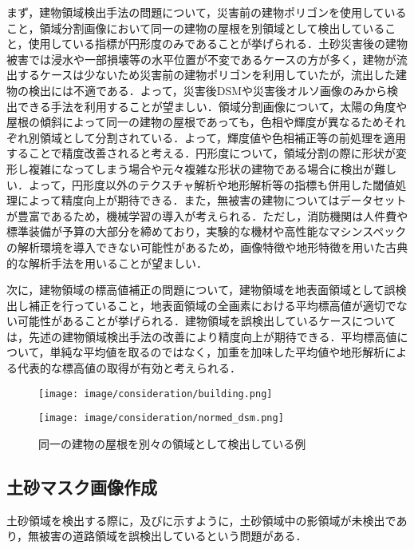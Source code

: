       まず，建物領域検出手法の問題について，災害前の建物ポリゴンを使用していること，領域分割画像において同一の建物の屋根を別領域として検出していること，使用している指標が円形度のみであることが挙げられる．土砂災害後の建物被害では浸水や一部損壊等の水平位置が不変であるケースの方が多く，建物が流出するケースは少ないため災害前の建物ポリゴンを利用していたが，流出した建物の検出には不適である．よって，災害後DSMや災害後オルソ画像のみから検出できる手法を利用することが望ましい．領域分割画像について，太陽の角度や屋根の傾斜によって同一の建物の屋根であっても，色相や輝度が異なるためそれぞれ別領域として分割されている．よって，輝度値や色相補正等の前処理を適用することで精度改善されると考える．円形度について，領域分割の際に形状が変形し複雑になってしまう場合や元々複雑な形状の建物である場合に検出が難しい．よって，円形度以外のテクスチャ解析や地形解析等の指標も併用した閾値処理によって精度向上が期待できる．また，無被害の建物についてはデータセットが豊富であるため，機械学習の導入が考えられる．ただし，消防機関は人件費や標準装備が予算の大部分を締めており，実験的な機材や高性能なマシンスペックの解析環境を導入できない可能性があるため，画像特徴や地形特徴を用いた古典的な解析手法を用いることが望ましい\cite{消防白書}．

      次に，建物領域の標高値補正の問題について，建物領域を地表面領域として誤検出し補正を行っていること，地表面領域の全画素における平均標高値が適切でない可能性があることが挙げられる．建物領域を誤検出しているケースについては，先述の建物領域検出手法の改善により精度向上が期待できる．平均標高値について，単純な平均値を取るのではなく，加重を加味した平均値や地形解析による代表的な標高値の取得が有効と考えられる．

      \begin{figure}[tbp]
        \begin{minipage}[c]{0.5\hsize}
          \centering
          \texttt{[image: image/consideration/building.png]}
        \end{minipage}
        \begin{minipage}[c]{0.5\hsize}
          \centering
          \texttt{[image: image/consideration/normed\_dsm.png]}
        \end{minipage}
        \caption{同一の建物の屋根を別々の領域として検出している例}
        \label{建物領域低精度例}
      \end{figure}      


    \subsection*{土砂マスク画像作成}
      土砂領域を検出する際に，及びに示すように，土砂領域中の影領域が未検出であり，無被害の道路領域を誤検出しているという問題がある．

